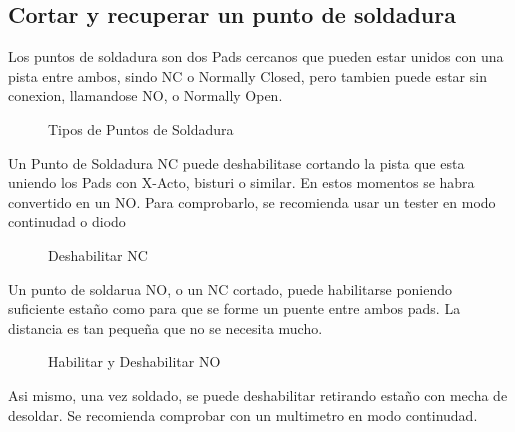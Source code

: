 \subsection{Cortar y recuperar un punto de soldadura}
Los puntos de soldadura son dos Pads cercanos que pueden estar unidos con una pista entre
ambos, sindo NC o Normally Closed, pero tambien puede estar sin conexion, llamandose NO, o
Normally Open. 

\begin{figure}[H]
    \centering
    
    \caption{Tipos de Puntos de Soldadura}
    \label{fig:JpTipos}
\end{figure}

Un Punto de Soldadura NC puede deshabilitase cortando la pista que esta uniendo los Pads
con X-Acto, bisturi o similar. En estos momentos se
habra convertido en un NO. Para comprobarlo, se recomienda usar un tester en modo
continudad o diodo

\begin{figure}[H]
    \centering
    
    \caption{Deshabilitar NC}
    \label{fig:JpNc2No}
\end{figure}

Un punto de soldarua NO, o un NC cortado, puede habilitarse poniendo suficiente estaño como
para que se forme un puente entre ambos pads. La distancia es tan pequeña que no se necesita
mucho.

\begin{figure}[H]
    \centering
    
    \caption{Habilitar y Deshabilitar NO}
    \label{fig:JpNo}
\end{figure}

Asi mismo, una vez soldado, se puede deshabilitar retirando estaño con mecha
de desoldar. Se recomienda comprobar con un multimetro en modo continudad.